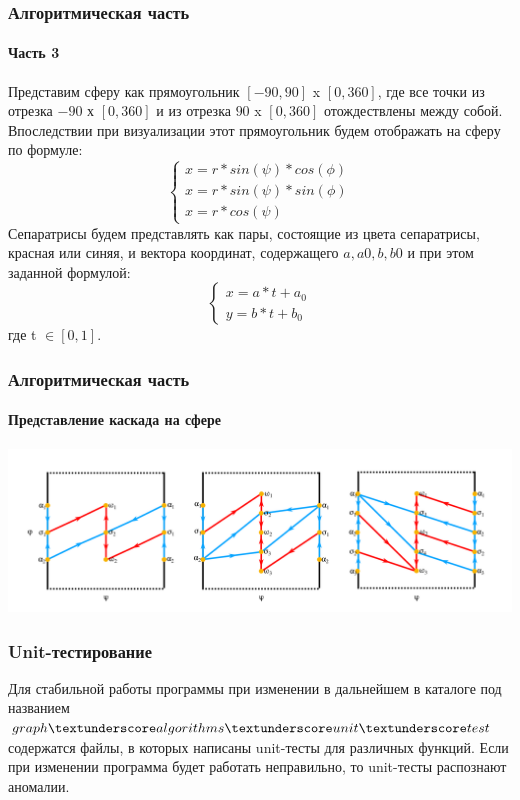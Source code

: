 \documentclass[aspectratio=169]{beamer}
\begin{document}
\begin{frame}
	\frametitle{Алгоритмическая часть}
	\framesubtitle{Часть 3}
	Представим сферу как прямоугольник $[-90, 90]$ x $[0, 360]$, где все точки из отрезка $-90$ х $[0, 360]$ и из отрезка $90$ x $[0, 360]$ отождествлены между собой. Впоследствии при визуализации этот прямоугольник будем отображать на сферу по формуле:
	$$ \begin{cases}
		x = r * sin(\psi) * cos(\phi)\\
		x = r * sin(\psi) * sin(\phi)\\
		x = r * cos(\psi)
	\end{cases} $$ Сепаратрисы будем представлять как пары, состоящие из цвета сепаратрисы, красная или синяя, и вектора координат, содержащего $a, a0, b, b0$ и при этом заданной формулой:
	$$ \begin{cases}
		x = a * t + a_0\\
		y = b * t + b_0
	\end{cases} $$ где t $\in [0, 1]$.
\end{frame}
\begin{frame}
	\frametitle{Алгоритмическая часть}
	\framesubtitle{Представление каскада на сфере}
	\includegraphics[width=\textwidth]{Projections.png}
\end{frame}
\begin{frame}
\frametitle{Unit-тестирование}
	Для стабильной работы программы при изменении в дальнейшем в каталоге под названием $graph \textunderscore algorithms \textunderscore unit \textunderscore test$ содержатся файлы, в которых написаны unit-тесты для различных функций. Если при изменении программа будет работать неправильно, то unit-тесты распознают аномалии.
\end{frame}
\end{document}
